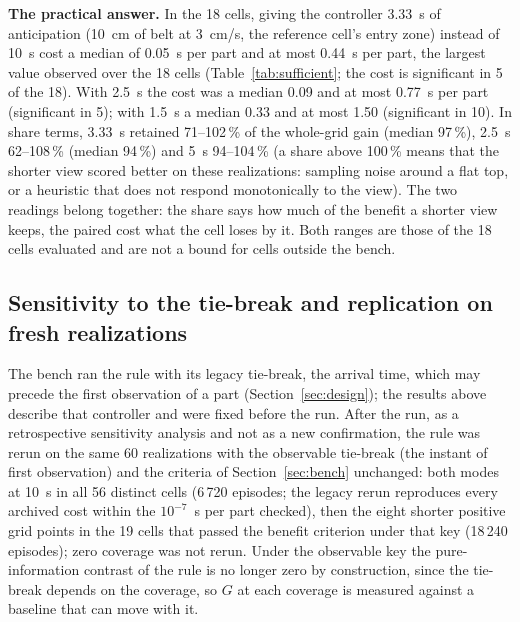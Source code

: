 \documentclass[11pt,a4paper]{article}
\begin{document}
\textbf{The practical answer.} In the 18 cells, giving the controller 3.33~s of
anticipation (10~cm of belt at 3~cm/s, the reference cell's entry zone) instead of 10~s
cost a median of 0.05~s per part and at most 0.44~s per part, the largest value observed
over the 18 cells (Table~\ref{tab:sufficient}; the cost is significant in 5 of the 18).
With 2.5~s the cost was a median 0.09 and at most 0.77~s per part (significant in 5); with
1.5~s a median 0.33 and at most 1.50 (significant in 10). In share terms, 3.33~s retained
71--102\,\% of the whole-grid gain (median 97\,\%), 2.5~s 62--108\,\% (median 94\,\%) and
5~s 94--104\,\% (a share above 100\,\% means that the shorter view scored better on these
realizations: sampling noise around a flat top, or a heuristic that does not respond
monotonically to the view). The two
readings belong together: the share says how much of the benefit a shorter view keeps,
the paired cost what the cell loses by it. Both ranges are those of the 18 cells evaluated
and are not a bound for cells outside the bench.

\subsection{Sensitivity to the tie-break and replication on fresh realizations}\label{sec:tiebreak}
The bench ran the rule with its legacy tie-break, the arrival time, which may precede
the first observation of a part (Section~\ref{sec:design}); the results above describe
that controller and were fixed before the run. After the run, as a retrospective
sensitivity analysis and not as a new confirmation, the rule was rerun on the same 60
realizations with the observable tie-break (the instant of first observation) and the
criteria of Section~\ref{sec:bench} unchanged: both modes at 10~s in all 56 distinct cells
(6\,720 episodes; the legacy rerun reproduces every archived cost within the $10^{-7}$~s per
part checked), then the eight shorter positive grid points in the 19 cells that passed the
benefit criterion under that key (18\,240 episodes); zero coverage was not rerun. Under the
observable key the pure-information contrast of the rule is no longer zero by
construction, since the tie-break depends on the coverage, so $G$ at each coverage is
measured against a baseline that can move with it.
\end{document}

